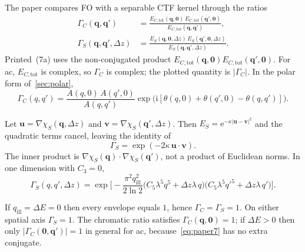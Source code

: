 \documentclass[11pt,a4paper]{article}
\theoremstyle{definition}
\theoremstyle{remark}
\newcommand{\ee}{\mathrm{e}}
\newcommand{\ii}{\mathrm{i}}
\newcommand{\abs}[1]{\lvert#1\rvert}
\newcommand{\qill}{q_{\mathrm{ill}}}
\newcommand{\DE}{\Delta E}
\newcommand{\Dz}{\Delta z}
\newcommand{\EStot}{E_{S}}
\newcommand{\ECtot}{E_{C,\mathrm{tot}}}
\begin{document}
The paper compares FO with a separable CTF kernel through the
ratios~\cite{Yu2019}
\begin{equation}
\label{eq:paper7}
\begin{aligned}
\Gamma_C(\mathbf{q},\mathbf{q}')
&=\frac{\ECtot(\mathbf{q},\mathbf{0})\,\ECtot(\mathbf{q}',\mathbf{0})}
{\ECtot(\mathbf{q},\mathbf{q}')},
\\
\Gamma_S(\mathbf{q},\mathbf{q}',\Dz)
&=\frac{\EStot(\mathbf{q},\mathbf{0},\Dz)\,\EStot(\mathbf{q}',\mathbf{0},\Dz)}
{\EStot(\mathbf{q},\mathbf{q}',\Dz)}.
\end{aligned}
\end{equation}
Printed~(7a) uses the non-conjugated product
$\ECtot(\mathbf{q},\mathbf{0})\ECtot(\mathbf{q}',\mathbf{0})$.
For ac, $\ECtot$ is complex, so $\Gamma_C$ is complex; the plotted
quantity is $\abs{\Gamma_C}$.
In the polar form of~\cref{sec:polar},
\begin{equation}
\label{eq:gammaC-polar}
\Gamma_C(q,q')
=\frac{A(q,0)\,A(q',0)}{A(q,q')}
\exp\bigl(\ii[\theta(q,0)+\theta(q',0)-\theta(q,q')]\bigr).
\end{equation}

Let $\mathbf{u}=\nabla\chi_S(\mathbf{q},\Dz)$ and
$\mathbf{v}=\nabla\chi_S(\mathbf{q}',\Dz)$.
Then $\EStot=\ee^{-\kappa\abs{\mathbf{u}-\mathbf{v}}^2}$ and the
quadratic terms cancel, leaving the identity of~\cite{Yu2019}
\begin{equation}
\label{eq:gammaS}
\Gamma_S=\exp(-2\kappa\,\mathbf{u}\cdot\mathbf{v}).
\end{equation}
The inner product is $\nabla\chi_S(\mathbf{q})\cdot\nabla\chi_S(\mathbf{q}')$,
not a product of Euclidean norms.
In one dimension with $C_3=0$,
\begin{equation}
\label{eq:gammaS-ac}
\Gamma_S(q,q',\Dz)
=\exp\Biggl[
-\frac{\pi^2\qill^2}{2\ln 2}
\bigl(C_5\lambda^5 q^5+\Dz\lambda\,q\bigr)
\bigl(C_5\lambda^5 {q'}^5+\Dz\lambda\,q'\bigr)
\Biggr].
\end{equation}

If $\qill=\DE=0$ then every envelope equals $1$, hence
$\Gamma_C=\Gamma_S=1$.
On either spatial axis $\Gamma_S=1$.
The chromatic ratio satisfies $\Gamma_C(\mathbf{q},\mathbf{0})=1$;
if $\DE>0$ then only $\abs{\Gamma_C(\mathbf{0},\mathbf{q}')}=1$ in
general for ac, because~\eqref{eq:paper7} has no extra conjugate.
\end{document}

